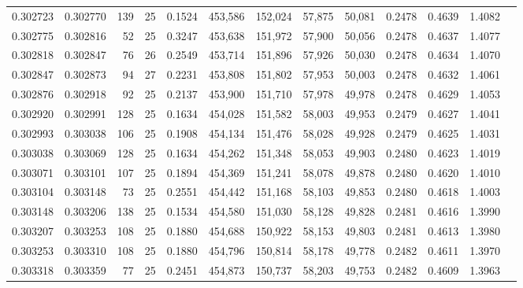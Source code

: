 \begin{tabular}{rrrrrrrrrrrrr}
0.302723 & 0.302770 &   139 &  25 &                                     0.1524 & 453,586 & 152,024 &  57,875 &  50,081 & 0.2478 & 0.4639 & 1.4082 \\
0.302775 & 0.302816 &    52 &  25 &                                     0.3247 & 453,638 & 151,972 &  57,900 &  50,056 & 0.2478 & 0.4637 & 1.4077 \\
0.302818 & 0.302847 &    76 &  26 &                                     0.2549 & 453,714 & 151,896 &  57,926 &  50,030 & 0.2478 & 0.4634 & 1.4070 \\
0.302847 & 0.302873 &    94 &  27 &                                     0.2231 & 453,808 & 151,802 &  57,953 &  50,003 & 0.2478 & 0.4632 & 1.4061 \\
0.302876 & 0.302918 &    92 &  25 &                                     0.2137 & 453,900 & 151,710 &  57,978 &  49,978 & 0.2478 & 0.4629 & 1.4053 \\
0.302920 & 0.302991 &   128 &  25 &                                     0.1634 & 454,028 & 151,582 &  58,003 &  49,953 & 0.2479 & 0.4627 & 1.4041 \\
0.302993 & 0.303038 &   106 &  25 &                                     0.1908 & 454,134 & 151,476 &  58,028 &  49,928 & 0.2479 & 0.4625 & 1.4031 \\
0.303038 & 0.303069 &   128 &  25 &                                     0.1634 & 454,262 & 151,348 &  58,053 &  49,903 & 0.2480 & 0.4623 & 1.4019 \\
0.303071 & 0.303101 &   107 &  25 &                                     0.1894 & 454,369 & 151,241 &  58,078 &  49,878 & 0.2480 & 0.4620 & 1.4010 \\
0.303104 & 0.303148 &    73 &  25 &                                     0.2551 & 454,442 & 151,168 &  58,103 &  49,853 & 0.2480 & 0.4618 & 1.4003 \\
0.303148 & 0.303206 &   138 &  25 &                                     0.1534 & 454,580 & 151,030 &  58,128 &  49,828 & 0.2481 & 0.4616 & 1.3990 \\
0.303207 & 0.303253 &   108 &  25 &                                     0.1880 & 454,688 & 150,922 &  58,153 &  49,803 & 0.2481 & 0.4613 & 1.3980 \\
0.303253 & 0.303310 &   108 &  25 &                                     0.1880 & 454,796 & 150,814 &  58,178 &  49,778 & 0.2482 & 0.4611 & 1.3970 \\
0.303318 & 0.303359 &    77 &  25 &                                     0.2451 & 454,873 & 150,737 &  58,203 &  49,753 & 0.2482 & 0.4609 & 1.3963 \\

\end{tabular}
